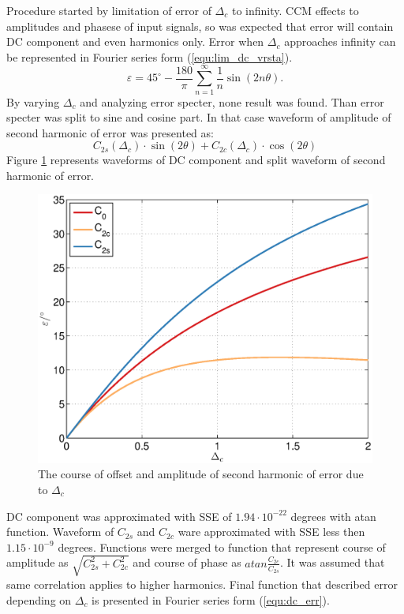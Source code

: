 \documentclass[a4paper]{article}
\begin{document}
Procedure started by limitation of error of $\Delta_c$ to infinity. CCM effects to amplitudes and phasese of input signals, so was expected that error will contain DC component and even harmonics only.
Error when $\Delta_c$ approaches infinity can be represented in Fourier series form (\ref{equ:lim_dc_vrsta}).
\begin{equation}
\label{equ:lim_dc_vrsta}
\varepsilon = 45^\circ -\frac{180}{\pi}\sum_{n=1}^{\infty}\frac{1}{n} \sin( 2 n \theta).
\end{equation}
By varying $\Delta_c$ and analyzing error specter, none result was found.
Than error specter was split to sine and cosine part. In that case waveform of amplitude of second harmonic of error was presented as:
\begin{equation}
C_{2s}(\Delta_c) \cdot\sin(2\theta)+C_{2c}(\Delta_c) \cdot\cos(2\theta)
\end{equation}
Figure \ref{fig:dc} represents waveforms of DC component and split waveform of second harmonic of error.
\begin{figure}[!htb]
	\begin{center}
		\includegraphics[width=\linewidth]{./Slike/dc.eps}
		\caption{The course of offset and amplitude of second harmonic of error due to $\Delta_{c}$} \label{fig:dc}
	\end{center}
\end{figure}

DC component was approximated with SSE of $1.94 \cdot 10^{-22}$ degrees with atan function. Waveform of $C_{2s}$ and $C_{2c}$ ware approximated with SSE less then $1.15 \cdot 10^{-9}$ degrees. Functions were  merged to function that represent course of amplitude as $\sqrt{C_{2s}^2+C_{2c}^2}$ and course of phase as $atan \frac{C_{2c}}{C_{2s}}$. It was assumed that same correlation applies to higher harmonics. 
Final function that described error depending on $\Delta_c$ is presented in Fourier series form (\ref{equ:dc_err}).
\end{document}
